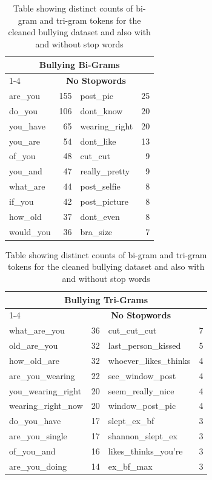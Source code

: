 \begin{table}[h]
\centering
\caption[Distinct n-gram word counts (cleaned datasets)]{Table showing distinct counts of bi-gram and tri-gram tokens for the cleaned bullying dataset and also with and without stop words}
\label{tab:chapter4:word_count_bullying_clean}
\begin{tabular}{lrlr}
	\toprule
	\multicolumn{4}{c}{\textbf{Bullying Bi-Grams}} \\
	\cmidrule(r){1-4}
	\multicolumn{2}{c}{\textbf{With Stopwords}} & \multicolumn{2}{c}{\textbf{No Stopwords}} \\
    \midrule
	are\_you	&	155 & post\_pic		& 25	\\
	do\_you		&	106 & dont\_know	& 20	\\
	you\_have	&	65 & wearing\_right	& 20	\\
	you\_are	&	54 & dont\_like		& 13	\\
	of\_you		&	48 & cut\_cut		& 9	\\
	you\_and	&	47 & really\_pretty	& 9	\\
	what\_are	&	44 & post\_selfie	& 8	\\
	if\_you		&	42 & post\_picture	& 8	\\
	how\_old	&	37 & dont\_even		& 8	\\
	would\_you	&	36 & bra\_size		& 7	\\
    \bottomrule
    \end{tabular}
\begin{tabular}{lrlr}
	\toprule
	\multicolumn{4}{c}{\textbf{Bullying Tri-Grams}} \\
	\cmidrule(r){1-4}
	\multicolumn{2}{c}{\textbf{With Stopwords}} & \multicolumn{2}{c}{\textbf{No Stopwords}} \\
    \midrule
	what\_are\_you		& 36 &	cut\_cut\_cut			& 7 \\
	old\_are\_you		& 32 &	last\_person\_kissed	& 5 \\
	how\_old\_are		& 32 &	whoever\_likes\_thinks	& 4 \\
	are\_you\_wearing	& 22 &	see\_window\_post		& 4 \\
	you\_wearing\_right	& 20 &	seem\_really\_nice		& 4 \\
	wearing\_right\_now	& 20 &	window\_post\_pic		& 4 \\
	do\_you\_have		& 17 &	slept\_ex\_bf			& 3 \\
	are\_you\_single	& 17 &	shannon\_slept\_ex		& 3 \\
	of\_you\_and		& 16 &	likes\_thinks\_you're	& 3 \\
	are\_you\_doing		& 14  &	ex\_bf\_max				& 3 \\
    \bottomrule
    \end{tabular}
\end{table}

